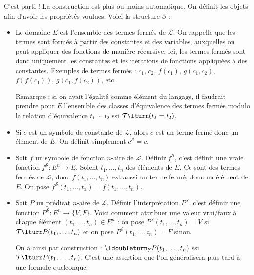 \documentclass[11pt,class=report,crop=false]{standalone}
\begin{document}
C'est parti ! La construction est plus ou moins automatique. On définit les objets afin d'avoir les propriétés voulues.
Voici la structure $\mathcal{S}$ :
\begin{itemize}
	\item Le domaine $E$ est l'ensemble des termes fermés de $\mathcal{L}$.
	On rappelle que les termes sont formés à partir des constantes et des variables, auxquelles on peut appliquer des fonctions de manière récursive. Ici, les termes fermés sont donc uniquement les constantes et les itérations de fonctions appliquées à des constantes.
	Exemples de termes fermés : $c_1$, $c_2$, $f(c_1)$, $g(c_1, c_2)$, $f(f(c_1))$, $g(c_1,f(c_2))$, etc.
	
	Remarque : si on avait l'égalité comme élément du langage, il faudrait prendre pour $E$ l'ensemble des classes d'équivalence des termes fermés modulo la relation d'équivalence $t_1 \sim t_2$ ssi $\mathcal{T} \lturn (t_1 = t_2)$.
	
	\item Si $c$ est un symbole de constante de $\mathcal{L}$, alors $c$ est un terme fermé donc un élément de $E$. On définit simplement $c^{\mathcal{S}} = c$.
	
	\item Soit $f$ un symbole de fonction $n$-aire de $\mathcal{L}$. Définir $f^{\mathcal{S}}$, c'est définir une \og{}vraie\fg{} fonction $f^{\mathcal{S}} : E^n \to E$.
	Soient $t_1, \ldots, t_n$ des éléments de $E$. Ce sont des termes fermés de $\mathcal{L}$, donc $f(t_1, \ldots, t_n)$ est aussi un terme fermé, donc un élément de $E$. On pose $f^{\mathcal{S}}(t_1, \ldots, t_n) = f(t_1, \ldots, t_n)$.
	
	\item Soit $P$ un prédicat $n$-aire de $\mathcal{L}$. Définir l'interprétation $P^{\mathcal{S}}$, c'est définir une fonction $P^{\mathcal{S}} : E^n \to \{V, F\}$. Voici comment attribuer une valeur vrai/faux à chaque élément $(t_1, \ldots, t_n) \in E^n$ : 
	on pose $P^{\mathcal{S}}(t_1, \ldots, t_n) = V$ si $\mathcal{T} \lturn P(t_1, \ldots, t_n)$ et on pose $P^{\mathcal{S}}(t_1, \ldots, t_n) = F$ sinon.
	
	On a ainsi par construction : $\ldoubleturn_{\mathcal{S}} P(t_1, \ldots, t_n)$ ssi $\mathcal{T} \lturn P(t_1, \ldots, t_n)$. C'est une assertion que l'on généralisera plus tard à une formule quelconque.
\end{itemize}



\end{document}
